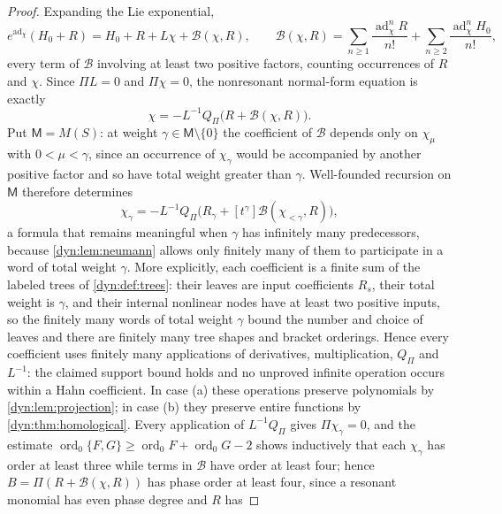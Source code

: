 \documentclass[11pt,letterpaper]{article}
\theoremstyle{definition}
\theoremstyle{remark}
\newcommand{\ord}{\operatorname{ord}}
\newcommand{\ad}{\operatorname{ad}}
\numberwithin{equation}{section}
\begin{document}
\begin{proof}
Expanding the Lie exponential,
\begin{equation}\label{dyn:eq:normalexpansion}
 e^{\ad_\chi}(H_0+R)=H_0+R+L\chi+\mathcal B(\chi,R),\qquad
 \mathcal B(\chi,R)=\sum_{n\ge1}\frac{\ad_\chi^{n}R}{n!}
 +\sum_{n\ge2}\frac{\ad_\chi^{n}H_0}{n!},
\end{equation}
every term of $\mathcal B$ involving at least two positive factors,
counting occurrences of $R$ and $\chi$. Since $\Pi L=0$ and $\Pi\chi=0$,
the nonresonant normal-form equation is exactly
\begin{equation}\label{dyn:eq:chifixed}
 \chi=-L^{-1}Q_\Pi\bigl(R+\mathcal B(\chi,R)\bigr).
\end{equation}
Put $\mathsf M=M(S)$: at weight $\gamma\in\mathsf M\setminus\{0\}$ the
coefficient of $\mathcal B$ depends only on $\chi_\mu$ with
$0<\mu<\gamma$, since an occurrence of $\chi_\gamma$ would be accompanied
by another positive factor and so have total weight greater than $\gamma$.
Well-founded recursion on $\mathsf M$ therefore determines
\begin{equation}\label{dyn:eq:coefficientrecursion}
 \chi_\gamma=-L^{-1}Q_\Pi\bigl(R_\gamma
 +[t^{\gamma}]\mathcal B(\chi_{<\gamma},R)\bigr),
\end{equation}
a formula that remains meaningful when $\gamma$ has infinitely many
predecessors, because \cref{dyn:lem:neumann} allows only finitely many of
them to participate in a word of total weight $\gamma$. More explicitly,
each coefficient is a finite sum of the labeled trees of
\cref{dyn:def:trees}: their leaves are input coefficients $R_s$, their
total weight is $\gamma$, and their internal nonlinear nodes have at least
two positive inputs, so the finitely many words of total weight $\gamma$
bound the number and choice of leaves and there are finitely many tree
shapes and bracket orderings. Hence every coefficient uses finitely many
applications of derivatives, multiplication, $Q_\Pi$ and $L^{-1}$: the
claimed support bound holds and no unproved infinite operation occurs
within a Hahn coefficient. In case (a) these operations preserve
polynomials by \cref{dyn:lem:projection}; in case (b) they preserve entire
functions by \cref{dyn:thm:homological}. Every application of
$L^{-1}Q_\Pi$ gives $\Pi\chi_\gamma=0$, and the estimate
$\ord_0\{F,G\}\ge\ord_0F+\ord_0G-2$ shows inductively that each
$\chi_\gamma$ has order at least three while terms in $\mathcal B$ have
order at least four; hence $B=\Pi(R+\mathcal B(\chi,R))$ has phase order at
least four, since a resonant monomial has even phase degree and $R$ has

\end{proof}
\end{document}
